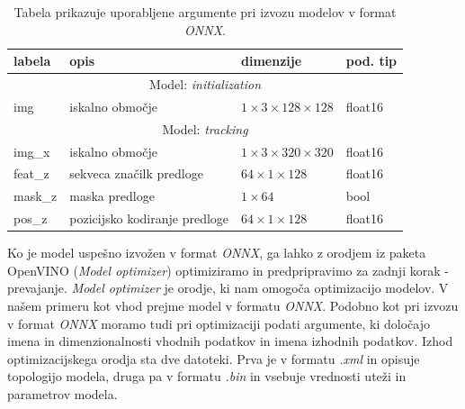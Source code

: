 \documentclass[a4paper,12pt,openright]{book}
\begin{document}
\begin {footnotesize}
\begin{table}[htb]
    \begin{tabular}{p{}|p{}|p{}|p{}}    %
        {\bf labela } & {\bf opis}                                  & {\bf dimenzije}                      & {\bf pod. tip} \\ \hline
        \multicolumn{4}{c}{Model: \emph{initialization}}                                                                    \\
        \hline
        img           & \footnotesize iskalno območje               & $ 1 \times 3 \times 128 \times 128 $ & float16        \\
        \hline
        \multicolumn{4}{c}{Model: \emph{tracking}}                                                                          \\
        \hline
        img\_x        & \footnotesize iskalno območje               & $ 1 \times 3 \times 320 \times 320 $ & float16        \\
        feat\_z       & \footnotesize sekveca značilk predloge      & $ 64 \times 1 \times 128 $           & float16        \\
        mask\_z       & \footnotesize maska predloge                & $ 1 \times 64  $                     & bool           \\
        pos\_z        & \footnotesize pozicijsko kodiranje predloge & $ 64 \times 1 \times 128 $           & float16        \\
    \end{tabular}
    \caption{Tabela prikazuje uporabljene argumente pri izvozu modelov v format \emph{ONNX}.}
    \label{tab:onnx}
\end{table}
\end{footnotesize}



Ko je model uspešno izvožen v format \emph{ONNX}, ga lahko z orodjem iz paketa OpenVINO (\emph{Model optimizer}) optimiziramo in predpripravimo za zadnji korak - prevajanje. \emph{Model optimizer} je orodje, ki nam omogoča optimizacijo modelov. V našem primeru kot vhod prejme model v formatu \emph{ONNX}. Podobno kot pri izvozu v format \emph{ONNX} moramo tudi pri optimizaciji podati argumente, ki določajo imena in dimenzionalnosti vhodnih podatkov in imena izhodnih podatkov. Izhod optimizacijskega orodja sta dve datoteki. Prva je v formatu \emph{.xml} in opisuje topologijo modela, druga pa v formatu \emph{.bin} in vsebuje vrednosti uteži in parametrov modela.
\end{document}
